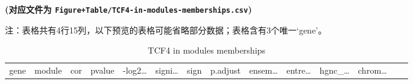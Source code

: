 \documentclass[
]{article}
\begin{document}
\textbf{(对应文件为 \texttt{Figure+Table/TCF4-in-modules-memberships.csv})}

\begin{center}\begin{tcolorbox}[colback=gray!10, colframe=gray!50, width=0.9\linewidth, arc=1mm, boxrule=0.5pt]注：表格共有4行15列，以下预览的表格可能省略部分数据；表格含有3个唯一`gene'。
\end{tcolorbox}
\end{center}

\begin{longtable}[]{@{}llllllllllllll@{}}
\caption{\label{tab:TCF4-in-modules-memberships}TCF4 in modules memberships}\tabularnewline
\toprule
\begin{minipage}[b]{0.05\columnwidth}\raggedright
gene\strut
\end{minipage} & \begin{minipage}[b]{0.04\columnwidth}\raggedright
module\strut
\end{minipage} & \begin{minipage}[b]{0.04\columnwidth}\raggedright
cor\strut
\end{minipage} & \begin{minipage}[b]{0.04\columnwidth}\raggedright
pvalue\strut
\end{minipage} & \begin{minipage}[b]{0.05\columnwidth}\raggedright
-log2\ldots{}\strut
\end{minipage} & \begin{minipage}[b]{0.05\columnwidth}\raggedright
signi\ldots{}\strut
\end{minipage} & \begin{minipage}[b]{0.03\columnwidth}\raggedright
sign\strut
\end{minipage} & \begin{minipage}[b]{0.05\columnwidth}\raggedright
p.adjust\strut
\end{minipage} & \begin{minipage}[b]{0.05\columnwidth}\raggedright
ensem\ldots{}\strut
\end{minipage} & \begin{minipage}[b]{0.05\columnwidth}\raggedright
entre\ldots{}\strut
\end{minipage} & \begin{minipage}[b]{0.05\columnwidth}\raggedright
hgnc\_\ldots{}\strut
\end{minipage} & \begin{minipage}[b]{0.05\columnwidth}\raggedright
chrom\ldots{}\strut

\end{minipage}
\end{longtable}
\end{document}
